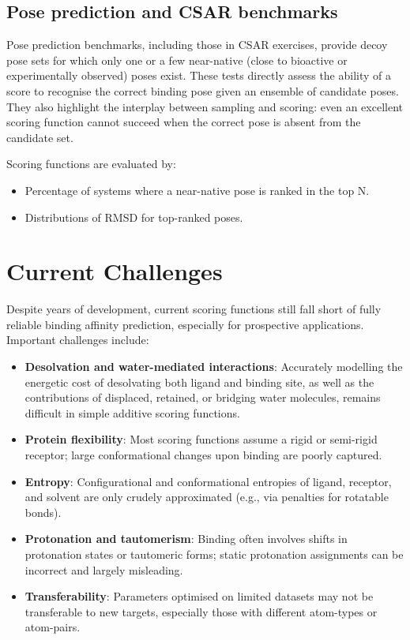 \documentclass[12pt]{article}
\begin{document}
\subsection{Pose prediction and CSAR benchmarks}
Pose prediction benchmarks, including those in CSAR exercises, provide decoy pose sets for which only one or a few near-native (close to bioactive or experimentally observed) poses exist\cite{CH3_CSAR2013}. These tests directly assess the ability of a score to recognise the correct binding pose given an ensemble of candidate poses. They also highlight the interplay between sampling and scoring: even an excellent scoring function cannot succeed when the correct pose is absent from the candidate set.

Scoring functions are evaluated by:
\begin{itemize}
    \item Percentage of systems where a near-native pose is ranked in the top N.
    \item Distributions of RMSD for top-ranked poses.
\end{itemize}

\section{Current Challenges}
Despite years of development, current scoring functions still fall short of fully reliable binding affinity prediction, especially for prospective applications\cite{CH3_Wang2017,CH3_Su2019_CASF2016}. Important challenges include:

\begin{itemize}
    \item \textbf{Desolvation and water-mediated interactions}: Accurately modelling the energetic cost of desolvating both ligand and binding site, as well as the contributions of displaced, retained, or bridging water molecules, remains difficult in simple additive scoring functions.
    \item \textbf{Protein flexibility}: Most scoring functions assume a rigid or semi-rigid receptor; large conformational changes upon binding are poorly captured.
    \item \textbf{Entropy}: Configurational and conformational entropies of ligand, receptor, and solvent are only crudely approximated (e.g., via penalties for rotatable bonds).
    \item \textbf{Protonation and tautomerism}: Binding often involves shifts in protonation states or tautomeric forms; static protonation assignments can be incorrect and largely misleading.
    \item \textbf{Transferability}: Parameters optimised on limited datasets may not be transferable to new targets, especially those with different atom-types or atom-pairs.
\end{itemize}
\end{document}
